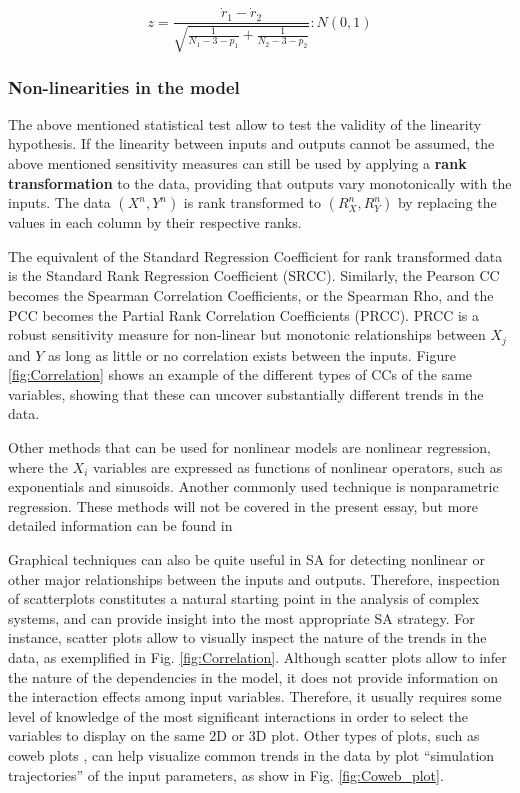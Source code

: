 \documentclass[12pt]{article}
\begin{document}
{\begin{equation}
  z=\frac{\dot r_{1}-\dot r_{2}}{\sqrt{\frac{1}{N_{1}-3-p_{1}}+\frac{1}{N_{2}-3-p_{2}}}}: N(0,1)
\end{equation}

\vspace{0.5cm}

\subsubsection{Non-linearities in the model}

The above mentioned statistical test allow to test the validity of the linearity hypothesis. If the linearity between inputs and outputs cannot be assumed, the above mentioned sensitivity measures can still be used by applying a \textbf{rank transformation} to the data, providing that outputs vary monotonically with the inputs. 
The data $(X^{n},Y^{n})$ is rank transformed to $(R^{n}_{X},R^{n}_{Y})$ by replacing the values in each column by their respective ranks. 

The equivalent of the Standard Regression Coefficient for rank transformed data is the Standard Rank Regression Coefficient (SRCC). Similarly, the Pearson CC becomes the Spearman Correlation Coefficients, or the Spearman Rho, and the PCC becomes the Partial Rank Correlation Coefficients (PRCC).  PRCC is a robust sensitivity measure for non-linear but monotonic relationships between $X_{j}$ and $Y$ as long as little or no correlation exists between the inputs. Figure \ref{fig:Correlation} shows an example of the different types of CCs of the same variables, showing that these can uncover substantially different trends in the data. 

Other methods that can be used for nonlinear models are nonlinear regression, where the $X_{i}$ variables are expressed as functions of nonlinear operators, such as exponentials and sinusoids.  Another commonly used technique is nonparametric regression. These methods will not be covered in the present essay, but more detailed information can be found in \cite{HELTON20061175,SaltelliThePrimer}

Graphical techniques can also be quite useful in SA for detecting nonlinear or other major relationships between the inputs and outputs. Therefore, inspection of scatterplots constitutes a natural starting point in the analysis of complex systems, and can provide insight into the most appropriate SA strategy. For instance, scatter plots allow to visually inspect the nature of the trends in the data, as exemplified in Fig. \ref{fig:Correlation}. Although scatter plots allow to infer the nature of the dependencies in the model, it does not provide information on the interaction effects among input variables. Therefore, it usually requires some level of knowledge of the most significant interactions in order to select the variables to display on the same 2D or 3D plot. Other types of plots, such as coweb plots \cite{UncertaintyAnalysis}, can help visualize common trends in the data by plot ``simulation trajectories'' of the input parameters, as show in Fig. \ref{fig:Coweb_plot}.   

}
\end{document}
